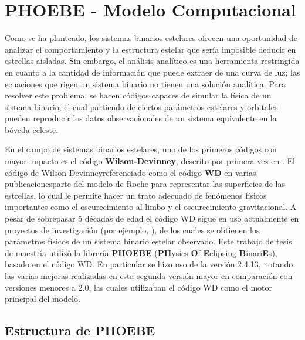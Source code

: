 \chapter{PHOEBE - Modelo Computacional}

Como se ha planteado, los sistemas binarios estelares ofrecen una oportunidad de
analizar el comportamiento y la estructura estelar que sería imposible deducir
en estrellas aisladas. Sin embargo, el análisis analítico es una herramienta
restringida en cuanto a la cantidad de información que puede extraer de una
curva de luz; las ecuaciones que rigen un sistema binario no tienen una solución
analítica. Para resolver este problema, se hacen códigos capaces de simular la
física de un sistema binario, el cual partiendo de ciertos parámetros estelares
y orbitales pueden reproducir los datos observacionales de un sistema
equivalente en la bóveda celeste.

En el campo de sistemas binarios estelares, uno de los primeros códigos con
mayor impacto es el código \textbf{Wilson-Devinney}, descrito por primera vez en
\autocite{wilson_devinney_realization_of_accurate_binary_lcs_wd_1971}. El código
de Wilson-Devinney\textemdash referenciado como el código \textbf{WD} en varias
publicaciones\textemdash parte del modelo de Roche para representar las
superficies de las estrellas, lo cual le permite hacer un trato adecuado de
fenómenos físicos importantes como el oscurecimiento al limbo y el
oscurecimiento gravitacional. A pesar de sobrepasar 5 décadas de edad el código
WD sigue en uso actualmente en proyectos de investigación (por ejemplo,
\autocite{li_extremely_low_mass_ratio_wd_analysis_2022}), de los cuales se
obtienen los parámetros físicos de un sistema binario estelar observado. Este
trabajo de tesis de maestría utilizó la librería \textbf{PHOEBE}
(\textbf{PH}ysics \textbf{O}f \textbf{E}clipsing \textbf{B}inari\textbf{E}s),
basado en el código WD. En particular se hizo uso de la versión 2.4.13, notando
las varias mejoras realizadas en esta segunda versión mayor en comparación con
versiones menores a 2.0, las cuales utilizaban el código WD como el motor
principal del modelo.

\section{Estructura de PHOEBE}

